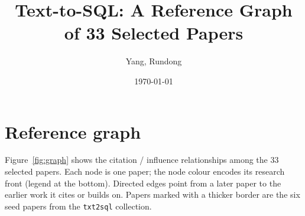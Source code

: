 \documentclass[11pt,a4paper]{article}
\begin{document}
\title{\bf Text-to-SQL: A Reference Graph of 33 Selected Papers}
\author{Yang, Rundong}
\date{\today}
\maketitle

\section{Reference graph}

Figure~\ref{fig:graph} shows the citation / influence relationships among the
33 selected papers. Each node is one paper; the node colour encodes its
research front (legend at the bottom). Directed edges point from a later paper
to the earlier work it cites or builds on. Papers marked with a thicker border
are the six seed papers from the \texttt{txt2sql} collection.
\end{document}
